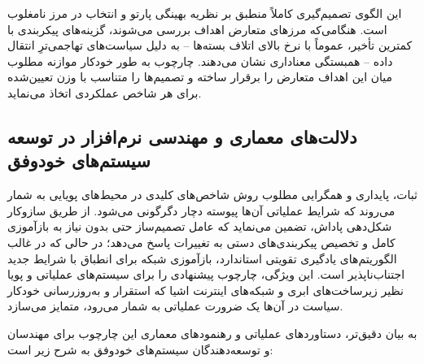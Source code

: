 \documentclass[oneside,openany,phd]{TMU-Thesis}
\begin{document}
این الگوی تصمیم‌گیری کاملاً منطبق بر نظریه بهینگی پارتو و انتخاب در مرز نامغلوب است. هنگامی‌که مرزهای متعارض اهداف بررسی می‌شوند، گزینه‌های پیکربندی با کمترین تأخیر، عموماً با نرخ بالای اتلاف بسته‌ها – به دلیل سیاست‌های تهاجمی‌ترِ انتقال داده – همبستگی معناداری نشان می‌دهند. چارچوب  به طور خودکار موازنه مطلوب میان این اهداف متعارض را برقرار ساخته و تصمیم‌ها را متناسب با وزن تعیین‌شده برای هر شاخص عملکردی اتخاذ می‌نماید.

\subsection{دلالت‌های معماری و مهندسی نرم‌افزار در توسعه سیستم‌های خودوفق}

ثبات، پایداری و همگرایی مطلوب روش  شاخص‌های کلیدی در محیط‌های پویایی به شمار می‌روند که شرایط عملیاتی آن‌ها پیوسته دچار دگرگونی می‌شود. از طریق سازوکار شکل‌دهی پاداش،  تضمین می‌نماید که عامل تصمیم‌ساز حتی بدون نیاز به بازآموزی کامل و تخصیص پیکربندی‌های دستی به تغییرات پاسخ می‌دهد؛ در حالی که در غالب الگوریتم‌های یادگیری تقویتی استاندارد، بازآموزی شبکه برای انطباق با شرایط جدید اجتناب‌ناپذیر است. این ویژگی، چارچوب پیشنهادی را برای سیستم‌های عملیاتی و پویا نظیر زیرساخت‌های ابری و شبکه‌های اینترنت اشیا که استقرار و به‌روزرسانی خودکار سیاست در آن‌ها یک ضرورت عملیاتی به شمار می‌رود، متمایز می‌سازد.

به بیان دقیق‌تر، دستاوردهای عملیاتی و رهنمودهای معماری این چارچوب برای مهندسان و توسعه‌دهندگان سیستم‌های خودوفق به شرح زیر است:
\end{document}
